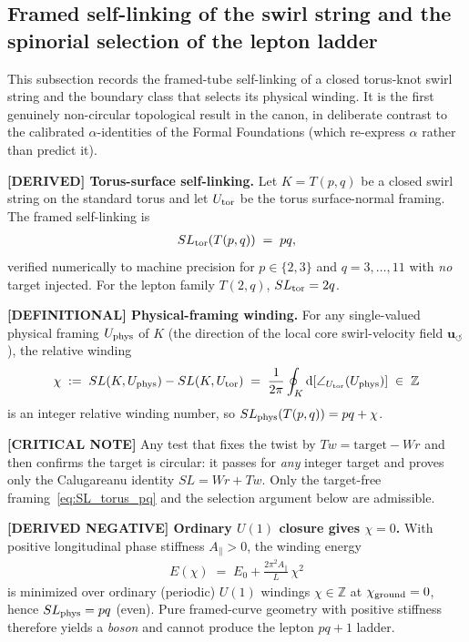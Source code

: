 \documentclass[11pt]{article}
\theoremstyle{definition}
\theoremstyle{plain}
\theoremstyle{remark}
\newcommand{\uswirl}{\mathbf{u}_{\!\boldsymbol{\circlearrowleft}}}
\begin{document}
    \subsection{Framed self-linking of the swirl string and the spinorial selection of the lepton ladder}
        \label{subsec:framed_selflinking_spinorial}

        This subsection records the framed-tube self-linking of a closed torus-knot swirl
        string and the boundary class that selects its physical winding. It is the first
        genuinely non-circular topological result in the canon, in deliberate contrast to the
        calibrated $\alpha$-identities of the Formal Foundations (which re-express $\alpha$
        rather than predict it).

        \textbf{[DERIVED] Torus-surface self-linking.}
        Let $K=T(p,q)$ be a closed swirl string on the standard torus and let $U_{\rm tor}$ be
        the torus surface-normal framing. The framed self-linking is
        \begin{align}
            SL_{\rm tor}(T(p,q)) \;=\; pq,
            \label{eq:SL_torus_pq}
        \end{align}
        verified numerically to machine precision for $p\in\{2,3\}$ and $q=3,\dots,11$ with
        \emph{no} target injected. For the lepton family $T(2,q)$, $SL_{\rm tor}=2q$.

        \textbf{[DEFINITIONAL] Physical-framing winding.}
        For any single-valued physical framing $U_{\rm phys}$ of $K$ (the direction of the local core
        swirl-velocity field $\uswirl$), the relative winding
        \begin{align}
            \chi \;:=\; SL(K,U_{\rm phys})-SL(K,U_{\rm tor})
                  \;=\; \frac{1}{2\pi}\oint_K \mathrm{d}\!\left[\angle_{U_{\rm tor}}(U_{\rm phys})\right]
                  \;\in\; \mathbb{Z}
            \label{eq:chi_def}
        \end{align}
        is an integer relative winding number, so $SL_{\rm phys}(T(p,q))=pq+\chi$.

        \textbf{[CRITICAL NOTE]} Any test that fixes the twist by $Tw=\mathrm{target}-Wr$ and
        then confirms the target is circular: it passes for \emph{any} integer target and
        proves only the Calugareanu identity $SL=Wr+Tw$. Only the target-free
        framing~\eqref{eq:SL_torus_pq} and the selection argument below are admissible.

        \textbf{[DERIVED NEGATIVE] Ordinary $U(1)$ closure gives $\chi=0$.}
        With positive longitudinal phase stiffness $A_\parallel>0$, the winding energy
        \begin{align}
            E(\chi)\;=\;E_0+\frac{2\pi^2 A_\parallel}{L}\,\chi^2
            \label{eq:E_chi}
        \end{align}
        is minimized over ordinary (periodic) $U(1)$ windings $\chi\in\mathbb{Z}$ at
        $\chi_{\rm ground}=0$, hence $SL_{\rm phys}=pq$ (even). Pure framed-curve geometry with
        positive stiffness therefore yields a \emph{boson} and cannot produce the lepton
        $pq+1$ ladder.
\end{document}
